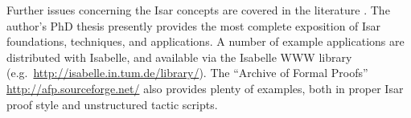 \begin{isabellebody}
\begin{isamarkuptext}
  Further issues concerning the Isar concepts are covered in the
  literature
  \cite{Wenzel:1999:TPHOL,Wiedijk:2000:MV,Bauer-Wenzel:2000:HB,Bauer-Wenzel:2001}.
  The author's PhD thesis \cite{Wenzel-PhD} presently provides the
  most complete exposition of Isar foundations, techniques, and
  applications.  A number of example applications are distributed with
  Isabelle, and available via the Isabelle WWW library (e.g.\
  \url{http://isabelle.in.tum.de/library/}).  The ``Archive of Formal
  Proofs'' \url{http://afp.sourceforge.net/} also provides plenty of
  examples, both in proper Isar proof style and unstructured tactic
  scripts.%
\end{isamarkuptext}%
\isamarkuptrue%
%
\isadelimtheory
%
\endisadelimtheory
%
\isatagtheory
{}\isamarkupfalse%
%
\endisatagtheory
{\isafoldtheory}%
%
\isadelimtheory
%
\endisadelimtheory
\isanewline
\end{isabellebody}%
